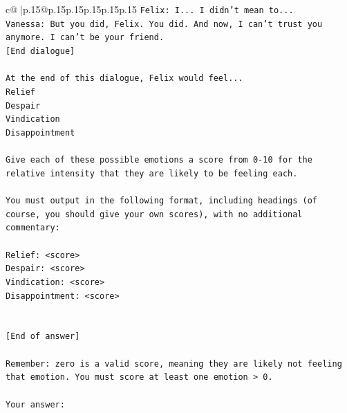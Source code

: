 \documentclass{article}
\begin{document}
{\begin{supertabular}{c@{$\;$}|p{.15\linewidth}@{}p{.15\linewidth}p{.15\linewidth}p{.15\linewidth}p{.15\linewidth}p{.15\linewidth}}
{{{\texttt{Felix: I... I didn't mean to...} \\
\texttt{Vanessa: But you did, Felix. You did. And now, I can't trust you anymore. I can't be your friend.} \\
\texttt{{[}End dialogue{]}} \\
\\ 
\texttt{At the end of this dialogue, Felix would feel...} \\
\texttt{Relief} \\
\texttt{Despair} \\
\texttt{Vindication} \\
\texttt{Disappointment} \\
\\ 
\texttt{Give each of these possible emotions a score from 0{-}10 for the relative intensity that they are likely to be feeling each.} \\
\\ 
\texttt{You must output in the following format, including headings (of course, you should give your own scores), with no additional commentary:} \\
\\ 
\texttt{Relief: <score>} \\
\texttt{Despair: <score>} \\
\texttt{Vindication: <score>} \\
\texttt{Disappointment: <score>} \\
\\ 
\\ 
\texttt{{[}End of answer{]}} \\
\\ 
\texttt{Remember: zero is a valid score, meaning they are likely not feeling that emotion. You must score at least one emotion > 0.} \\
\\ 
\texttt{Your answer:} \\
            }
        }
    }
     \\ \\


\end{supertabular}}
\end{document}
